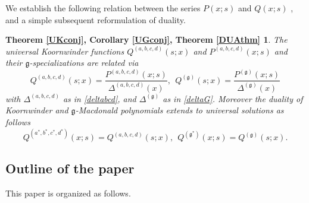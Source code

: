 \documentclass[12pt]{amsart}
\newcommand{\g}{{\mathfrak{g}}}
\numberwithin{equation}{section}
\begin{document}

We establish the following relation between the series $P(x;s)$ and $Q(x;s)$ , and a simple subsequent reformulation of duality.

\newtheorem*{UKconj}{Theorem \ref{UKconj}, Corollary \ref{UGconj}, Theorem \ref{DUAthm}}
\begin{UKconj}
 The universal Koornwinder functions $Q^{(a,b,c,d)}(s;x)$ and $P^{(a,b,c,d)}(x;s)$  and their $\g$-specializations
%
%
are related via
$$
Q^{(a,b,c,d)}(s;x)=\frac{P^{(a,b,c,d)}(x;s)}{\Delta^{(a,b,c,d)}(x)},\ \ Q^{(\g)}(s;x)=\frac{P^{(\g)}(x;s)}{\Delta^{(\g)}(x)}
$$
with $\Delta^{(a,b,c,d)}$ as in \eqref{deltabcd}, and $\Delta^{(\g)}$ as in \eqref{deltaG}. Moreover the duality of Koornwinder and $\g$-Macdonald polynomials extends to universal solutions as follows
$$Q^{(a^*,b^*,c^*,d^*)}(x;s)=Q^{(a,b,c,d)}(s;x), \ \ Q^{(\g^*)}(x;s)=Q^{(\g)}(s;x) .
$$
\end{UKconj}



%
%
%
%
%
%


%

\subsection{Outline of the paper}

This paper is organized as follows. 
\end{document}
